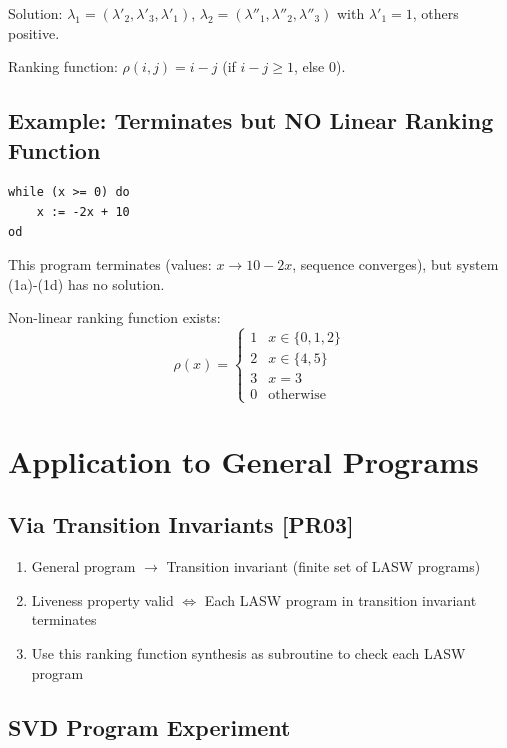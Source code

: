 \documentclass{article}
\begin{document}
Solution: $\lambda_1 = (\lambda'_2, \lambda'_3, \lambda'_1)$, $\lambda_2 = (\lambda''_1, \lambda''_2, \lambda''_3)$ with $\lambda'_1 = 1$, others positive.

Ranking function: $\rho(i,j) = i - j$ (if $i - j \geq 1$, else 0).

\subsection{Example: Terminates but NO Linear Ranking Function}

\begin{verbatim}
while (x >= 0) do
    x := -2x + 10
od
\end{verbatim}

This program terminates (values: $x \to 10 - 2x$, sequence converges), but system (1a)-(1d) has no solution.

Non-linear ranking function exists:
\begin{equation}
\rho(x) = \begin{cases}
1 & x \in \{0, 1, 2\}\\
2 & x \in \{4, 5\}\\
3 & x = 3\\
0 & \text{otherwise}
\end{cases}
\end{equation}

\section{Application to General Programs}

\subsection{Via Transition Invariants [PR03]}

\begin{enumerate}
    \item General program $\to$ Transition invariant (finite set of LASW programs)
    \item Liveness property valid $\Leftrightarrow$ Each LASW program in transition invariant terminates
    \item Use this ranking function synthesis as subroutine to check each LASW program
\end{enumerate}

\subsection{SVD Program Experiment}
\end{document}
